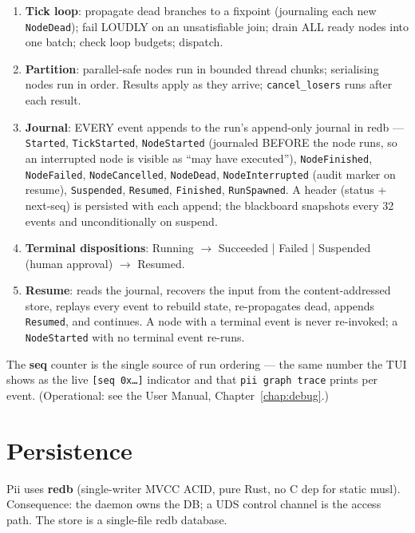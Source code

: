\documentclass[
	fontsize=10pt,
	twoside=false,
	secnumdepth=2,
	open=any,
]{kaobook}
\begin{document}
\begin{enumerate}
    \item \textbf{Tick loop}: propagate dead branches to a fixpoint
        (journaling each new \texttt{NodeDead}); fail LOUDLY on an
        unsatisfiable join; drain ALL ready nodes into one batch; check
        loop budgets; dispatch.
    \item \textbf{Partition}: parallel-safe nodes run in bounded thread
        chunks; serialising nodes run in order. Results apply as they
        arrive; \texttt{cancel\_losers} runs after each result.
    \item \textbf{Journal}: EVERY event appends to the run's append-only
        journal in redb — \texttt{Started}, \texttt{TickStarted},
        \texttt{NodeStarted} (journaled BEFORE the node runs, so an
        interrupted node is visible as ``may have executed''),
        \texttt{NodeFinished}, \texttt{NodeFailed}, \texttt{NodeCancelled},
        \texttt{NodeDead}, \texttt{NodeInterrupted} (audit marker on
        resume), \texttt{Suspended}, \texttt{Resumed}, \texttt{Finished},
        \texttt{RunSpawned}. A header (status + next-seq) is persisted
        with each append; the blackboard snapshots every 32 events and
        unconditionally on suspend.
    \item \textbf{Terminal dispositions}: Running $\rightarrow$ Succeeded
        | Failed | Suspended (human approval) $\rightarrow$ Resumed.
    \item \textbf{Resume}: reads the journal, recovers the input from the
        content-addressed store, replays every event to rebuild state,
        re-propagates dead, appends \texttt{Resumed}, and continues. A
        node with a terminal event is never re-invoked; a
        \texttt{NodeStarted} with no terminal event re-runs.
\end{enumerate}

The \textbf{seq} counter is the single source of run ordering — the same
number the TUI shows as the live \texttt{[seq 0x\ldots]} indicator and
that \texttt{pii graph trace} prints per event. (Operational: see the User
Manual, Chapter~\ref{chap:debug}.)

\chapter{Persistence}
\label{chap:store}

Pii uses \textbf{redb} (single-writer MVCC ACID, pure Rust, no C dep for
static musl). Consequence: the daemon owns the DB; a UDS control channel
is the access path. The store is a single-file redb database.
\end{document}
